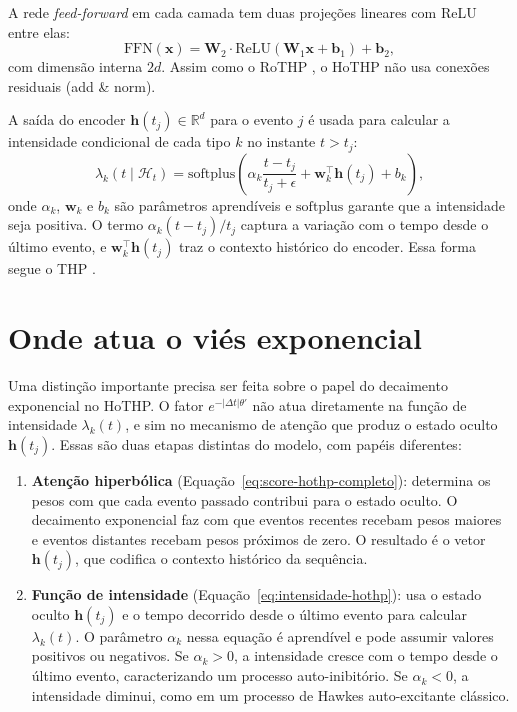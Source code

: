 A rede \textit{feed-forward} em cada camada tem duas projeções lineares com ReLU entre elas:
%
\begin{equation}
    \mathrm{FFN}(\mathbf{x}) = \mathbf{W}_2 \cdot \mathrm{ReLU}(\mathbf{W}_1 \mathbf{x} + \mathbf{b}_1) + \mathbf{b}_2,
\end{equation}
%
com dimensão interna $2d$. Assim como o RoTHP \cite{gao_rothp_2024}, o HoTHP não usa conexões residuais (add \& norm).

A saída do encoder $\mathbf{h}(t_j) \in \mathbb{R}^d$ para o evento $j$ é usada para calcular a intensidade condicional de cada tipo $k$ no instante $t > t_j$:
%
\begin{equation}
    \lambda_k(t \mid \mathcal{H}_t)
    = \mathrm{softplus}\!\left(
        \alpha_k \frac{t - t_j}{t_j + \epsilon}
        + \mathbf{w}_k^\top \mathbf{h}(t_j)
        + b_k
    \right),
    \label{eq:intensidade-hothp}
\end{equation}
%
onde $\alpha_k$, $\mathbf{w}_k$ e $b_k$ são parâmetros aprendíveis e $\mathrm{softplus}$ garante que a intensidade seja positiva. O termo $\alpha_k (t - t_j) / t_j$ captura a variação com o tempo desde o último evento, e $\mathbf{w}_k^\top \mathbf{h}(t_j)$ traz o contexto histórico do encoder. Essa forma segue o THP \cite{zuo_transformer_2021}.

\section{Onde atua o viés exponencial}
\label{sec:onde-atua-vies}

Uma distinção importante precisa ser feita sobre o papel do decaimento exponencial no HoTHP. O fator $e^{-|\Delta t|\theta'}$ não atua diretamente na função de intensidade $\lambda_k(t)$, e sim no mecanismo de atenção que produz o estado oculto $\mathbf{h}(t_j)$. Essas são duas etapas distintas do modelo, com papéis diferentes:

\begin{enumerate}
    \item \textbf{Atenção hiperbólica} (Equação~\ref{eq:score-hothp-completo}): determina os pesos com que cada evento passado contribui para o estado oculto. O decaimento exponencial faz com que eventos recentes recebam pesos maiores e eventos distantes recebam pesos próximos de zero. O resultado é o vetor $\mathbf{h}(t_j)$, que codifica o contexto histórico da sequência.

    \item \textbf{Função de intensidade} (Equação~\ref{eq:intensidade-hothp}): usa o estado oculto $\mathbf{h}(t_j)$ e o tempo decorrido desde o último evento para calcular $\lambda_k(t)$. O parâmetro $\alpha_k$ nessa equação é aprendível e pode assumir valores positivos ou negativos. Se $\alpha_k > 0$, a intensidade cresce com o tempo desde o último evento, caracterizando um processo auto-inibitório. Se $\alpha_k < 0$, a intensidade diminui, como em um processo de Hawkes auto-excitante clássico.
\end{enumerate}

